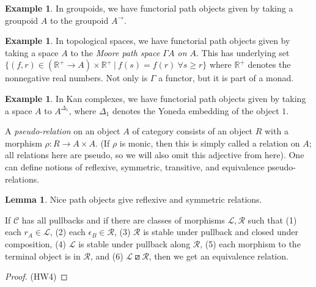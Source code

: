 \documentclass{article}
\theoremstyle{definition}
\newtheorem{lemma}[definition]{Lemma}
\newtheorem{example}[definition]{Example}
\newcommand{\C}{\mathcal C}
\begin{document}
\begin{example}
    In groupoids, we have functorial path objects given by taking a groupoid $A$ to the groupoid $A^\to$.
\end{example}

\begin{example}
    In topological spaces, we have functorial path objects given by taking a space $A$ to the \emph{Moore path space $\Gamma A$ on $A$}. This has underlying set $\{ (f, r) \in (\mathbb R^+ \to A ) \times \mathbb R^+ \ | \ f(s) = f(r) \ \forall s \geq r \}$ where $\mathbb R^+$ denotes the nonnegative real numbers. Not only is $\Gamma$ a functor, but it is part of a monad.
\end{example}

\begin{example}
    In Kan complexes, we have functorial path objects given by taking a space $A$ to $A^{\Delta_1}$, where $\Delta_1$ denotes the Yoneda embedding of the object $1$.
\end{example}

A \emph{pseudo-relation} on an object $A$ of category consists of an object $R$ with a morphism $\rho: R \to A \times A$. (If $\rho$ is monic, then this is simply called a relation on $A$; all relations here are pseudo, so we will also omit this adjective from here). One can define notions of reflexive, symmetric, transitive, and equivalence pseudo-relations.

\begin{lemma}
    \label{lem:equivalence relation}
    Nice path objects give reflexive and symmetric relations.

    If $\C$ has all pullbacks and if there are classes of morphisms $\mathcal L, \mathcal R$ such that (1) each $r_A \in \mathcal L$, (2) each $\epsilon_B \in \mathcal R$, (3) $\mathcal R$ is stable under pullback and closed under composition, (4) $\mathcal L$ is stable under pullback along $\mathcal R$, (5) each morphism to the terminal object is in $\mathcal R$, and (6) $\mathcal L \boxslash \mathcal R$, then we get an equivalence relation.
\end{lemma}

\begin{proof}
    (HW4)
\end{proof}
\end{document}
